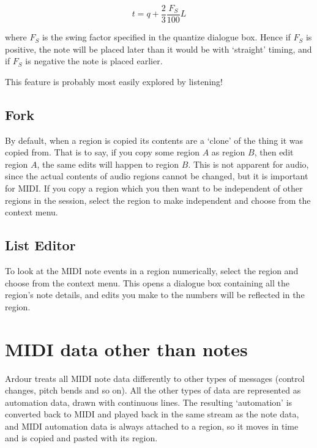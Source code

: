 \documentclass[10pt,a4paper]{book}
\newcommand{\menu}[1]{\emph{\StrSubstitute{#1}{,}{ $\rightarrow$ }}}
\begin{document}
{\begin{itemize}
\begin{equation}
t = q + \frac{2}{3} \frac{F_S}{100} L
\end{equation}

where $F_S$ is the swing factor specified in the quantize dialogue
box.  Hence if $F_S$ is positive, the note will be placed later than
it would be with `straight' timing, and if $F_S$ is negative the note
is placed earlier.

This feature is probably most easily explored by listening!

\end{itemize}


\subsection{Fork}

By default, when a region is copied its contents are a `clone' of the
thing it was copied from.  That is to say, if you copy some region $A$
as region $B$, then edit region $A$, the same edits will happen to
region $B$.  This is not apparent for audio, since the actual contents
of audio regions cannot be changed, but it is important for MIDI.  If
you copy a region which you then want to be independent of other
regions in the session, select the region to make independent and
choose \menu{MIDI,Fork} from the context menu.


\subsection{List Editor}

To look at the MIDI note events in a region numerically, select the
region and choose \menu{MIDI,List Editor\ldots} from the context menu.
This opens a dialogue box containing all the region's note details,
and edits you make to the numbers will be reflected in the region.


\section{MIDI data other than notes}
\label{sec:midi-non-note}

Ardour treats all MIDI note data differently to other types of
messages (control changes, pitch bends and so on).  All the other
types of data are represented as automation data, drawn with
continuous lines.  The resulting `automation' is converted back to
MIDI and played back in the same stream as the note data, and MIDI
automation data is always attached to a region, so it moves in time
and is copied and pasted with its region.

}
\end{document}
